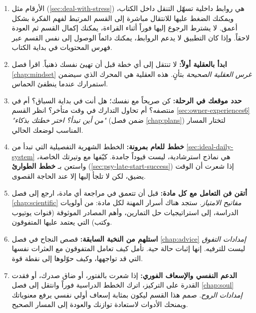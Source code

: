 \documentclass[12pt,a4paper]{book}
\begin{document}
	\begin{enumerate}
		
		\item الأرقام مثل (\ref{sec:deal-with-stress}) هي روابط داخلية تسهّل التنقل داخل الكتاب، ويمكنك الضغط عليها للانتقال مباشرة إلى القسم المرتبط لفهم الفكرة بشكل أعمق. لا يشترط الرجوع إليها فوراً أثناء القراءة، يمكنك إكمال القسم ثم العودة لاحقاً. وإذا كان التطبيق لا يدعم الروابط، يمكنك دائماً الوصول إلى نفس القسم عبر فهرس المحتويات في بداية الكتاب.
		
		\item \textbf{ابدأ بالعقلية أولاً:} لا تنتقل إلى أي خطة قبل أن تهيئ نفسك ذهنياً. اقرأ فصل \ref{chap:mindset} \textit{غرس العقلية الصحيحة} بتأنٍ. هذه العقلية هي المحرك الذي سيضمن استمرارك عندما ينطفئ الحماس.
		
		\item \textbf{حدد موقعك في الرحلة:} كن صريحاً مع نفسك؛ هل أنت في بداية السباق؟ أم في منتصفه؟ أم تحاول التدارك في وقت متأخر؟ انظر القسم \ref{sec:owner-experiences6} \textit{"من أين تبدأ؟ اختر خطتك بذكاء"} (ضمن فصل \ref{chap:plans}) لتختار المسار المناسب لوضعك الحالي.
		
		\item \textbf{خطط للعام بمرونة:} الخطط الشهرية التفصيلية التي تبدأ من \ref{sec:ideal-daily-system} هي نماذج استرشادية، ليست قيوداً جامدة. كيّفها مع وتيرتك الخاصة، واستعن بـ \textbf{خطط الطوارئ} (\ref{sec:psy-late-start-success}) إذا شعرت أن الوقت يضيق، لكن لا تلجأ إليها إلا عند الحاجة القصوى.
		
		\item \textbf{أتقن فن التعامل مع كل مادة:} قبل أن تتعمق في مراجعة أي مادة، ارجع إلى فصل \ref{chap:scientific} \textit{مفاتيح الامتياز}. ستجد هناك أسرار المهنة لكل مادة: من أولويات الدراسة، إلى استراتيجيات حل التمارين، وأهم المصادر الموثوقة (قنوات يوتيوب وكتب) التي يعتمد عليها المتفوقون.
		
		\item \textbf{استلهم من النخبة السابقة:} قصص النجاح في فصل \ref{chap:advice} \textit{إمدادات التفوق} ليست للترفيه. إنها إثبات حالة حية. تأمل كيف تعامل المتفوقون مع العثرات نفسها التي قد تواجهها، وكيف حوّلوها إلى نقطة قوة.
		
		\item \textbf{الدعم النفسي والإسعاف الفوري:} إذا شعرت بالفتور، أو ضاق صدرك، أو فقدت القدرة على التركيز، اترك الخطط الدراسية فوراً وانتقل إلى فصل \ref{chap:soul} \textit{إمدادات الروح}. صمم هذا القسم ليكون بمثابة إسعاف أولي نفسي يرفع معنوياتك ويمنحك الأدوات لاستعادة توازنك والعودة إلى المسار الصحيح.
		

\end{enumerate}
\end{document}
